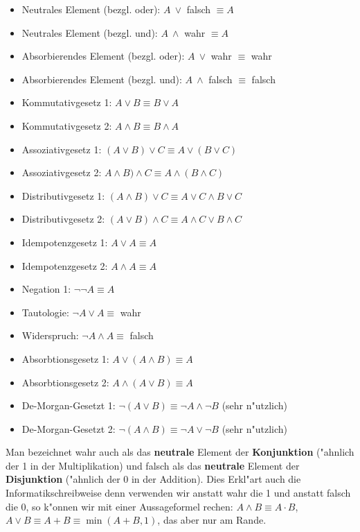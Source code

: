 \begin{itemize}
\item Neutrales Element (bezgl. oder): $A \ \lor $ falsch $\equiv A$
\item Neutrales Element (bezgl. und): $A \ \land $ wahr $\equiv A$
\item Absorbierendes Element (bezgl. oder): $A \ \lor $ wahr $\equiv$ wahr
\item Absorbierendes Element (bezgl. und): $A \ \land $ falsch $\equiv$ falsch
\item Kommutativgesetz 1: $A \lor B \equiv B \lor A$
\item Kommutativgesetz 2: $A \land B \equiv B \land A$
\item Assoziativgesetz 1: $(A \lor B) \lor C \equiv A \lor (B \lor C)$
\item Assoziativgesetz 2: $A \land B) \land C \equiv A \land (B \land C)$
\item Distributivgesetz 1: $(A \land B) \lor C \equiv A \lor C \land  B \lor C$
\item Distributivgesetz 2: $(A \lor B) \land C \equiv A \land C \lor B \land C$
\item Idempotenzgesetz 1: $A \lor A \equiv A$
\item Idempotenzgesetz 2: $A \land A \equiv A$
\item Negation 1: $\neg \neg A \equiv A$
\item Tautologie: $\neg A \lor A \equiv $ wahr
\item Widerspruch: $\neg A \land A \equiv$ falsch
\item Absorbtionsgesetz 1: $A \lor (A \land B) \equiv A$
\item Absorbtionsgesetz 2: $A \land (A \lor B) \equiv A$
\item De-Morgan-Gesetzt 1: $\neg (A \lor B) \equiv \neg A \land \neg B$ (sehr n"utzlich)
\item De-Morgan-Gesetzt 2: $\neg (A \land B) \equiv \neg A \lor \neg B$ (sehr n"utzlich)
\end{itemize}
Man bezeichnet wahr auch als das \textbf{neutrale} Element der \textbf{Konjunktion} ("ahnlich der 1 in der Multiplikation) und falsch als das \textbf{neutrale} Element der \textbf{Disjunktion} ("ahnlich der 0 in der Addition). Dies Erkl"art auch die Informatikschreibweise denn verwenden wir anstatt wahr die 1 und anstatt falsch die 0, so k"onnen wir mit einer Aussageformel rechen: $A \land B \equiv A \cdot B$, $A \lor B \equiv A + B \equiv \min(A + B, 1)$, das aber nur am Rande.

